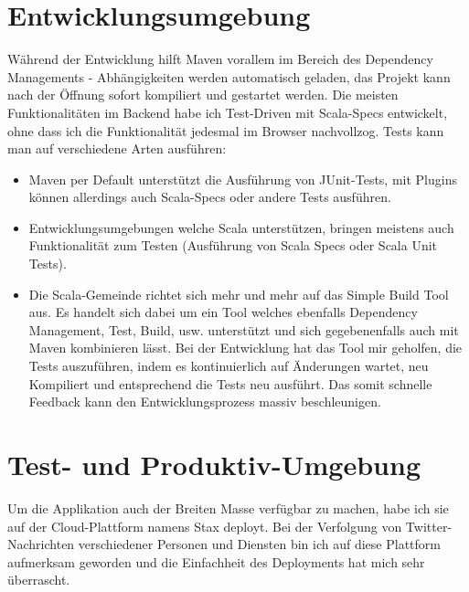 \section{Entwicklungsumgebung}
W\"ahrend der Entwicklung hilft Maven vorallem im Bereich des Dependency Managements - Abh\"angigkeiten werden automatisch geladen, das Projekt kann nach der \"Offnung sofort kompiliert und gestartet werden. Die meisten Funktionalit\"aten im Backend habe ich Test-Driven mit Scala-Specs entwickelt, ohne dass ich die Funktionalit\"at jedesmal im Browser nachvollzog. Tests kann man auf verschiedene Arten ausf\"uhren:
\begin{itemize}
\item Maven per Default unterst\"utzt die Ausf\"uhrung von JUnit-Tests, mit Plugins k\"onnen allerdings auch Scala-Specs oder andere Tests ausf\"uhren.
\item Entwicklungsumgebungen welche Scala unterst\"utzen, bringen meistens auch Funktionalit\"at zum Testen (Ausf\"uhrung von Scala Specs oder Scala Unit  Tests). 
\item Die Scala-Gemeinde richtet sich mehr und mehr auf das Simple Build Tool\cite{SimpleBuildTool} aus. Es handelt sich dabei um ein Tool welches ebenfalls Dependency Management, Test, Build, usw. unterst\"utzt und sich gegebenenfalls auch mit Maven kombinieren l\"asst. Bei der Entwicklung hat das Tool mir geholfen, die Tests auszuf\"uhren, indem es kontinuierlich auf \"Anderungen wartet, neu Kompiliert und entsprechend die Tests neu ausf\"uhrt. Das somit schnelle Feedback kann den Entwicklungsprozess massiv beschleunigen.\end{itemize}


\section{Test- und Produktiv-Umgebung}
Um die Applikation auch der Breiten Masse verf\"ugbar zu machen, habe ich sie auf der Cloud-Plattform namens Stax\cite{Stax} deployt. Bei der Verfolgung von Twitter-Nachrichten verschiedener Personen und Diensten bin ich auf diese Plattform aufmerksam geworden und die Einfachheit des Deployments hat mich sehr \"uberrascht.

